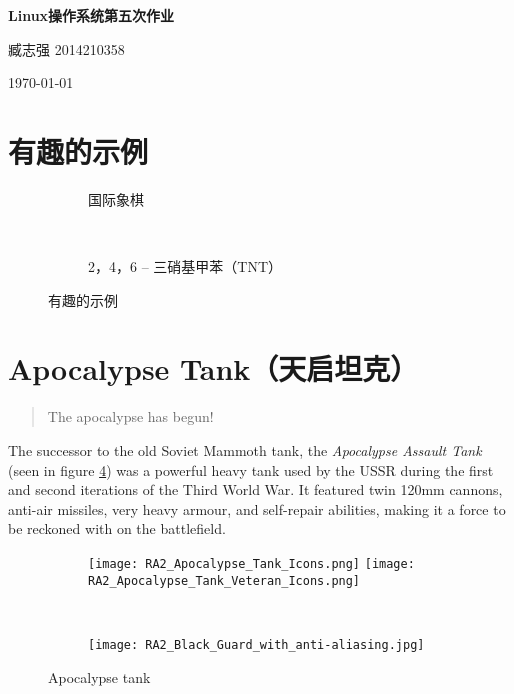 \documentclass[UTF8,12pt,a4paper]{ctexart}
\begin{document}
	\begin{center}
		\large
		\textbf{Linux操作系统第五次作业}
		
		臧志强 2014210358
		
		\today
	\end{center}	
	
	\section{有趣的示例}
	\begin{figure}[htbp]
		\centering
		\begin{subfigure}[b]{0.45\textwidth}
			\centering
			\newgame
			
			\showboard
			\caption{国际象棋}
			\label{fig:chess}
		\end{subfigure}
		~
		\begin{subfigure}[b]{0.45\textwidth}
			\centering
			\caption{2，4，6 -- 三硝基甲苯（TNT）}
			\label{fig:TNT}
		\end{subfigure}
		\caption{有趣的示例}
		\label{fig:demoes}
	\end{figure}

	\section{Apocalypse Tank（天启坦克）}
	
	\begin{quote}
		The apocalypse has begun!
	\end{quote}
	The successor to the old Soviet Mammoth tank, the \textit{Apocalypse Assault Tank} (seen in figure \ref{fig:icon}) was a powerful heavy tank used by the USSR during the first and second iterations of the Third World War. It featured twin 120mm cannons, anti-air missiles, very heavy armour, and self-repair abilities, making it a force to be reckoned with on the battlefield.
	\begin{figure}[h]
		\centering
			\begin{subfigure}[c]{0.1\textwidth}
				\texttt{[image: RA2\_Apocalypse\_Tank\_Icons.png]}
				\newline
				\newline
				\texttt{[image: RA2\_Apocalypse\_Tank\_Veteran\_Icons.png]}
			\end{subfigure}
		~~
			\begin{subfigure}[c]{0.5\textwidth}
				\texttt{[image: RA2\_Black\_Guard\_with\_anti-aliasing.jpg]}
			\end{subfigure}
		\caption{Apocalypse tank}			
		\label{fig:icon}
	\end{figure}	
	
\end{document}
